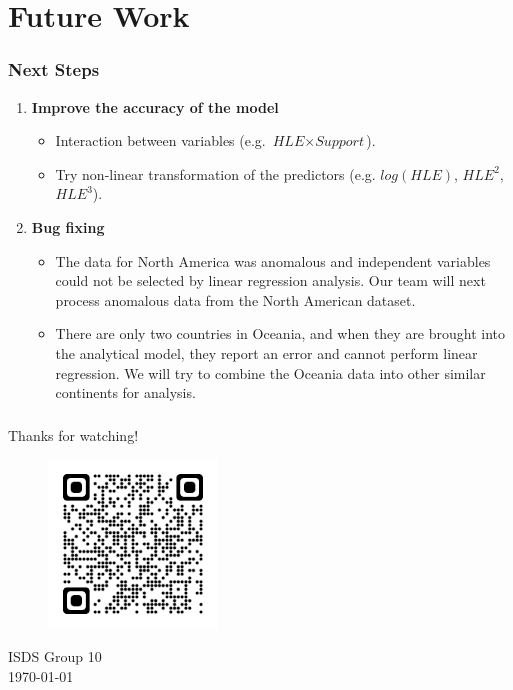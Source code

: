 \documentclass{beamer}
\begin{document}
\section{Future Work}
% 
% 
% 
% 
\begin{frame}
  \frametitle{Next Steps}
  \begin{enumerate}
    \item \textbf{Improve the accuracy of the model}
          \begin{itemize}
            \item Interaction between variables (e.g. $\textit{HLE} \times \textit{Support}$).
            \item Try non-linear transformation of the predictors (e.g. $log(HLE)$, $HLE^2$, $HLE^3$).
          \end{itemize}
    \item \textbf{Bug fixing}
          \begin{itemize}
            \item The data for North America was anomalous and independent variables could not be selected by linear regression analysis. Our team will next process anomalous data from the North American dataset.
            \item There are only two countries in Oceania, and when they are brought into the analytical model, they report an error and cannot perform linear regression. We will try to combine the Oceania data into other similar continents for analysis.
          \end{itemize}
  \end{enumerate}
\end{frame}
% 
% 
% 
% 
% 
% 
% 
% 
% 
% 
% 
% 
% 
% 
\begin{frame}
  \frametitle{}
  \centering
  \vfill
  \Huge Thanks for watching! \\
  \vfill
  \begin{figure}
    \includegraphics[width=0.4\textwidth]{img/qrcode_github.com.png}
  \end{figure}
  \vfill
  \small ISDS Group 10 \\
  \today
\end{frame}
\end{document}
